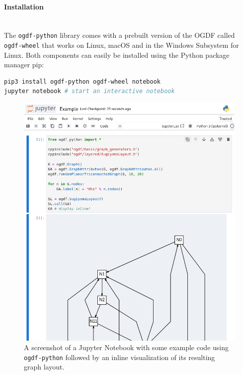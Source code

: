 \documentclass{llncs}
\begin{document}
\paragraph{Installation} \mbox{}\\
The \texttt{ogdf-python} library comes with a prebuilt version of the OGDF called \texttt{ogdf-wheel} that works on Linux, macOS and in the Windows Subsystem for Linux.
Both components can easily be installed using the Python package manager pip:

\begin{lstlisting}[language=bash]
pip3 install ogdf-python ogdf-wheel notebook
jupyter notebook # start an interactive notebook
\end{lstlisting}

\begin{figure}[h]
  \centering
  \includegraphics[width=.5\linewidth]{screenshot}
  \caption{A screenshot of a Jupyter Notebook with some example code using \texttt{ogdf-python} followed by an inline visualization of its resulting graph layout.}
  \label{fig}
\end{figure}



\end{document}

